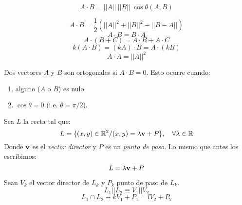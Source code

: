 \documentclass[alge.tex]{subfiles}
\begin{document}
\begin{mydef}
  \[A \cdot B = ||A|| \ ||B|| \ \cos{\theta (A,B)}\]
\end{mydef}
\begin{teo}[Propiedades]
  \[ A \cdot B = \frac{1}{2}(||A||^2 + ||B||^2 - ||B - A||)\]
  \[ A \cdot B = B \cdot A\]
  \[ A \cdot ( B + C ) = A \cdot B + A \cdot C \]
  \[ k (A \cdot B) = (kA) \cdot B = A \cdot (kB) \]
  \[A \cdot A = ||A||^2\]
\end{teo}

\begin{mydef}
  Dos vectores \(A\) y \(B\) son ortogonales si \(A \cdot B = 0\). Esto
  ocurre cuando:
  \begin{enumerate}
  \item alguno (\(A\) o \(B\)) es nulo.
  \item \(\cos{\theta} = 0\) (i.e. \(\theta = \pi/2\)).
  \end{enumerate}
\end{mydef}

\begin{mydef}
  Sea \(L\) la recta tal que:
  \[ L = \{ (x, y) \in \mathbb{R}^2 / (x,y) = \lambda \mathbf{v} + P \}, \quad
  \forall \lambda \in \mathbb{R}
  \]
  Donde \(\mathbf{v}\) es el \emph{vector director} y \(P\) es un \emph{punto
    de paso}. Lo mismo que antes los escribimos:
  \[L = \lambda \mathbf{v} + P\]
\end{mydef}

\begin{teo}
  Sean \(V_k\) el vector director de \(L_k\) y \(P_k\) punto de paso de \(L_k\).
  \[ L_1 || L_2 \equiv V_1 || V_2  \]
  \[ L_1 \cap L_2 \equiv k V_1 + P_1 = l V_2 + P_2 \] 
\end{teo}
\end{document}

